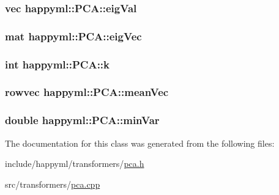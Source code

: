 \subsubsection[{\texorpdfstring{eig\+Val}{eigVal}}]{\setlength{\rightskip}{0pt plus 5cm}vec happyml\+::\+P\+C\+A\+::eig\+Val\hspace{0.3cm}{\ttfamily [protected]}}\hypertarget{classhappyml_1_1PCA_a0cb529e7070933c17b407a28a182a1fa}{}\label{classhappyml_1_1PCA_a0cb529e7070933c17b407a28a182a1fa}
\subsubsection[{\texorpdfstring{eig\+Vec}{eigVec}}]{\setlength{\rightskip}{0pt plus 5cm}mat happyml\+::\+P\+C\+A\+::eig\+Vec\hspace{0.3cm}{\ttfamily [protected]}}\hypertarget{classhappyml_1_1PCA_aaaf28f625e92e1985beee5bba9fa2a56}{}\label{classhappyml_1_1PCA_aaaf28f625e92e1985beee5bba9fa2a56}
\subsubsection[{\texorpdfstring{k}{k}}]{\setlength{\rightskip}{0pt plus 5cm}int happyml\+::\+P\+C\+A\+::k\hspace{0.3cm}{\ttfamily [protected]}}\hypertarget{classhappyml_1_1PCA_a5f2ee80482a6e93d6591e9d674c2b197}{}\label{classhappyml_1_1PCA_a5f2ee80482a6e93d6591e9d674c2b197}
\subsubsection[{\texorpdfstring{mean\+Vec}{meanVec}}]{\setlength{\rightskip}{0pt plus 5cm}rowvec happyml\+::\+P\+C\+A\+::mean\+Vec\hspace{0.3cm}{\ttfamily [protected]}}\hypertarget{classhappyml_1_1PCA_af7086a802a48818da96b850c6627114f}{}\label{classhappyml_1_1PCA_af7086a802a48818da96b850c6627114f}
\subsubsection[{\texorpdfstring{min\+Var}{minVar}}]{\setlength{\rightskip}{0pt plus 5cm}double happyml\+::\+P\+C\+A\+::min\+Var\hspace{0.3cm}{\ttfamily [protected]}}\hypertarget{classhappyml_1_1PCA_a1e7148cef7385f41f04010a827ec0899}{}\label{classhappyml_1_1PCA_a1e7148cef7385f41f04010a827ec0899}


The documentation for this class was generated from the following files\+:\begin{DoxyCompactItemize}
\item 
include/happyml/transformers/\hyperlink{pca_8h}{pca.\+h}\item 
src/transformers/\hyperlink{pca_8cpp}{pca.\+cpp}\end{DoxyCompactItemize}
